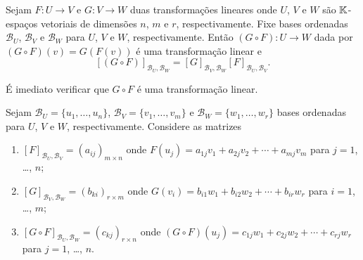 \begin{teorema}\label{matriz_da_composicao_de_transformacoes}
	Sejam $F : U \to V$ e $G : V \to W$ duas transforma\c{c}\~oes lineares onde $U$, $V$ e $W$ s\~ao $\mathbb{K}$-espa\c{c}os vetoriais de dimens\~oes $n$, $m$ e $r$, respectivamente. Fixe bases ordenadas $\mathcal{B}_U$, $\mathcal{B}_V$ e $\mathcal{B}_W$ para $U$, $V$ e $W$, respectivamente. Ent\~ao $(G \circ F) : U \to W$ dada por $(G\circ F)(v) = G(F(v))$ \'e uma transforma\c{c}\~ao linear e
	\[
		[(G \circ F)]_{{\mathcal{B}_U},{\mathcal{B}_W}} = [G]_{{\mathcal{B}_V},{\mathcal{B}_W}}[F]_{{\mathcal{B}_U},{\mathcal{B}_V}}.
	\]
\end{teorema}
\begin{prova}
	\'E imediato verificar que $G\circ F$ \'e uma transforma\c{c}\~ao linear.

	Sejam $\mathcal{B}_U = \{u_1,\dots,u_n\}$, $\mathcal{B}_V = \{v_1,\dots,v_m\}$ e $\mathcal{B}_W = \{w_1,\dots,w_r\}$ bases ordenadas para $U$, $V$ e $W$, respectivamente. Considere as matrizes
	\begin{enumerate}[label=({\arabic*})]
		\item $[F]_{{\mathcal{B}_U},{\mathcal{B}_V}} = (a_{ij})_{m\times n}$ onde $F(u_j) = a_{1j}v_1 + a_{2j}v_2 + \cdots + a_{mj}v_m$ para $j=1$, \dots, $n$;

		\item $[G]_{{\mathcal{B}_V},{\mathcal{B}_W}} = (b_{ki})_{r\times m}$ onde $G(v_i) = b_{i1}w_1 + b_{i2}w_2 + \cdots + b_{ir}w_r$ para $i=1$, \dots, $m$;

		\item $[G \circ F]_{{\mathcal{B}_U},{\mathcal{B}_W}} = (c_{kj})_{r\times n}$ onde $(G\circ F)(u_j) = c_{1j}w_1 + c_{2j}w_2 + \cdots + c_{rj}w_r$ para $j=1$, \dots, $n$.
	\end{enumerate}


\end{prova}
